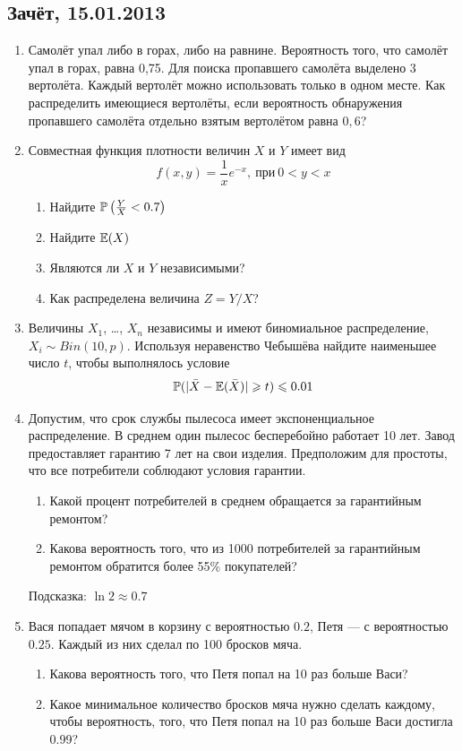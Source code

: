 \documentclass[12pt, a4paper]{article}\usepackage[]{graphicx}\usepackage[]{color}
\begin{document}
				\subsection{Зачёт, 15.01.2013}


				\begin{enumerate}
					\item Самолёт упал либо в горах, либо на равнине. Вероятность того, что самолёт упал в горах, равна 0{,}75. Для поиска пропавшего самолёта выделено 3 вертолёта. Каждый вертолёт можно использовать только в одном месте. Как распределить имеющиеся вертолёты, если вероятность обнаружения пропавшего самолёта отдельно взятым вертолётом равна $0,6$?

					\item Совместная функция плотности величин $X$ и $Y$ имеет вид
					\[
					f(x,y)=\frac{1}{x}e^{-x},\: \text{при}\: 0<y<x
					\]

					\begin{enumerate}
						\item Найдите $\P\left( \frac{Y}{X}<0.7 \right)$
						\item Найдите $\E(X)$
						\item Являются ли $X$ и $Y$ независимыми?
						\item Как распределена величина $Z=Y/X$?
					\end{enumerate}

					\item Величины $X_1$, \ldots, $X_n$ независимы и имеют биномиальное распределение, $X_i \sim Bin(10,p)$. Используя неравенство Чебышёва найдите наименьшее число $t$, чтобы выполнялось условие
					\[
					\P( | \bar{X}-\E(\bar{X}) | \geq t )\leq 0.01
					\]



					\item Допустим, что срок службы пылесоса имеет экспоненциальное распределение. В среднем один
					пылесос бесперебойно работает 10 лет. Завод предоставляет гарантию 7 лет на свои изделия.
					Предположим для простоты, что все потребители соблюдают условия гарантии.
					\begin{enumerate}
						\item Какой процент потребителей в среднем обращается за гарантийным ремонтом?
						\item Какова вероятность того, что из 1000 потребителей за гарантийным ремонтом обратится
						более 55\% покупателей?
					\end{enumerate}
					Подсказка: $\ln 2\approx 0.7$

					\item Вася попадает мячом в корзину с вероятностью $0.2$, Петя — с вероятностью $0.25$. Каждый из них сделал по 100 бросков мяча.
					\begin{enumerate}
						\item Какова вероятность того, что Петя попал на 10 раз больше Васи?
						\item Какое минимальное количество бросков мяча нужно сделать каждому, чтобы вероятность, того, что Петя попал на 10 раз больше Васи достигла 0.99?
					\end{enumerate}
				\end{enumerate}
\end{document}
